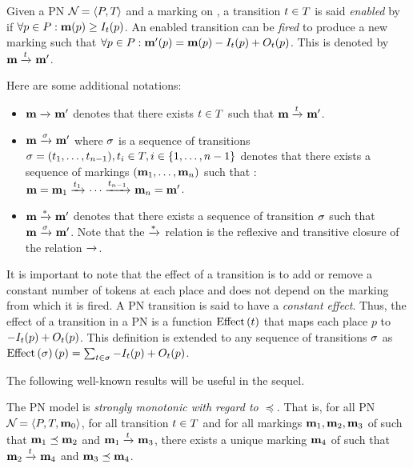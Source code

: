 Given a \ac{PN} $\mathcal{N}_{} = \left\langle P_{}, T_{}\right\rangle$ and a marking \mar on \namePN, a transition $t \in T$ is said \emph{enabled} by \mar if $\forall p \in \places : \mar(p) \geq \inw[t][p]$.
An enabled transition can be \emph{fired} to produce a new marking \marp such that $\forall p \in \places : \marp(p) = \mar(p) - \inw[t][p] + \outw[t][p]$.
This is denoted by $\mathbf{m} \xrightarrow{t}_{} \mathbf{m'}$.

Here are some additional notations:
\begin{itemize}
  \item $\mathbf{m} \xrightarrow{}_{} \mathbf{m'}$ denotes that there exists $t \in T$ such that $\mathbf{m} \xrightarrow{t}_{} \mathbf{m'}$.
  \item $\mar \fire{\seqt} \marp$ where $\seqt$ is a sequence of transitions $\defSeqt{1}{n-1}, t_i \in \transitions, i \in \range{1}{n-1}$ denotes that there exists a sequence of markings $\bodySeqm{1}{n}$ such that : $\mathbf{m} = \mathbf{m}_1 \xrightarrow{t_1}_{} \cdots \xrightarrow{t_{n-1}}_{} \mathbf{m}_n = \mathbf{m'}$.
  \item $\mathbf{m} \xrightarrow{*}_{} \mathbf{m'}$ denotes that there exists a sequence of transition $\seqt$ such that $\mar \fire{\seqt} \marp$.
    Note that the $\xrightarrow{*}_{}$ relation is the reflexive and transitive closure of the relation $\xrightarrow{}_{}$.
\end{itemize}

It is important to note that the effect of a transition is to add or remove a constant number of tokens at each place and does not depend on the marking from which it is fired.
A \ac{PN} transition is said to have a \emph{constant effect}.
Thus, the effect of a transition in a \ac{PN} is a function $\effect{t}$ that maps each place $p$ to $- \inw[t][p] + \outw[t][p]$.
This definition is extended to any sequence of transitions $\seqt$ as $\effect{\seqt}[p] = \sum_{t \in \seqt} -\inw[t][p] + \outw[t][p]$.

The following well-known results will be useful in the sequel.

\begin{lemm}
  \label{lemm:strong-monotonicity-of-pn}
  The \ac{PN} model is \emph{strongly monotonic with regard to $\preceq$}.
  That is, for all \ac{PN} $\defPN$, for all transition $t \in T$ and for all markings $\mathbf{m}_1, \mathbf{m}_2, \mathbf{m}_3$ of \namePN such that $\mathbf{m}_1 \preceq \mathbf{m}_2$ and $\mathbf{m}_1 \xrightarrow{t}_{} \mathbf{m}_3$, there exists a unique marking $\mathbf{m}_4$ of \namePN such that $\mathbf{m}_2 \xrightarrow{t}_{} \mathbf{m}_4$ and $\mathbf{m}_3 \preceq \mathbf{m}_4$.
\end{lemm}


